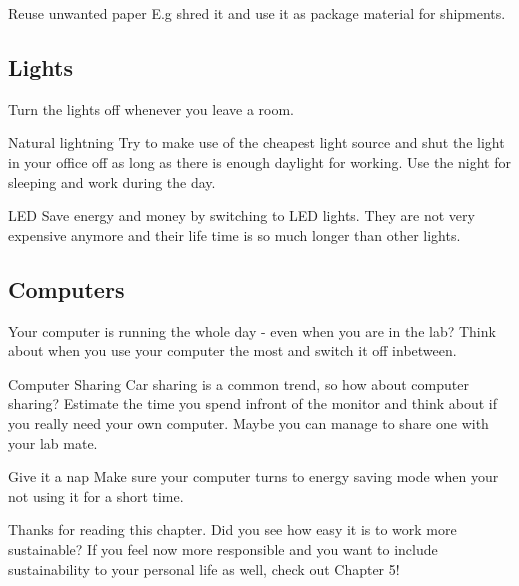 \begin{suggest}{Reuse unwanted paper}
	E.g shred it and use it as package material for shipments. 
\end{suggest} 

\subsection{Lights}
	Turn the lights off whenever you leave a room. 
	
\begin{suggest}{Natural lightning}
	Try to make use of the cheapest light source and shut the light in your office off as long as there is enough daylight for working. Use the night for sleeping and work during the day. 
\end{suggest} 

\begin{suggest}{LED}
		 Save energy and money by switching to LED lights. They are not very expensive anymore and their life time is so much longer than other lights.
\end{suggest}

\subsection{Computers}
	Your computer is running the whole day - even when you are in the lab? 
	Think about when you use your computer the most and switch it off inbetween.

\begin{suggest}{Computer Sharing}
	Car sharing is a common trend, so how about computer sharing? 
	Estimate the time you spend infront of the monitor and think about if you really need your own computer. Maybe you can manage to share one with your lab mate. 
\end{suggest}

\begin{suggest}{Give it a nap}
	Make sure your computer turns to energy saving mode when your not using it for a short time. 
\end{suggest}


Thanks for reading this chapter. Did you see how easy it is to work more sustainable? 
If you feel now more responsible and you want to include sustainability to your personal life as well, check out Chapter 5!  